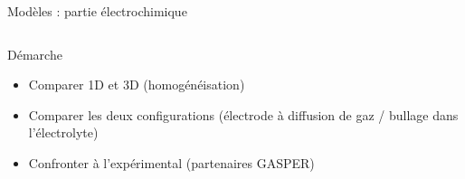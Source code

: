 \begin{frame}[t]{Modèles : partie électrochimique}
    \vspace{-0.75em}
    \begin{columns}[T,onlytextwidth]
      \column{\textwidth}
        \begin{pcbanner}{Démarche}
          \begin{itemize}\footnotesize
            \item Comparer 1D et 3D (homogénéisation)
            \item Comparer les deux configurations (électrode à diffusion de gaz / bullage dans l'électrolyte)
            \item Confronter à l'expérimental (partenaires GASPER)
          \end{itemize}
        \end{pcbanner}
    \end{columns}

\end{frame}


